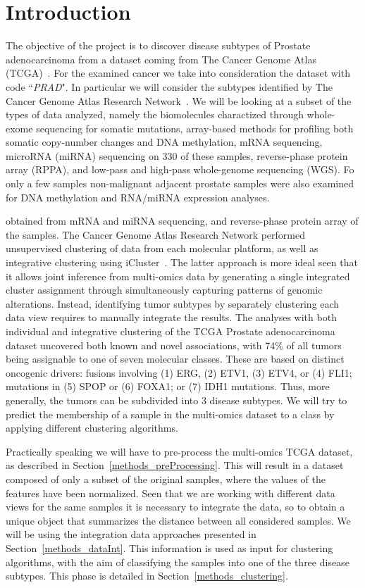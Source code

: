 \chapter{Introduction}\label{introduction}
The objective of the project is to discover disease subtypes of Prostate adenocarcinoma from a dataset coming from The Cancer Genome Atlas (TCGA)~\cite{hutter2018TCGA}. For the examined cancer we take into consideration the dataset with code ``\textit{PRAD}". In particular we will consider the subtypes identified by The Cancer Genome Atlas Research Network~\cite{abeshouse2015molecularPRAD}. We will be looking at a subset of the types of data analyzed, namely the biomolecules charactized through whole-exome sequencing for somatic mutations, array-based methods for profiling both somatic copy-number changes and DNA methylation, mRNA sequencing, microRNA (miRNA) sequencing on 330 of these samples, reverse-phase protein array (RPPA), and low-pass and high-pass whole-genome sequencing (WGS). Fo only a few samples non-malignant adjacent prostate samples were also examined for DNA methylation and RNA/miRNA expression analyses.




obtained from mRNA and miRNA sequencing, and reverse-phase protein array of the samples. The Cancer Genome Atlas Research Network performed unsupervised
clustering of data from each molecular platform, as well as integrative clustering using iCluster~\cite{shen2009integrative}. The latter approach is more ideal seen that it allows joint inference from multi-omics data by generating a single integrated cluster assignment through simultaneously capturing patterns of genomic alterations. Instead, identifying tumor subtypes by separately clustering each data view requires to manually integrate the results.
The analyses with both individual and integrative clustering of the TCGA Prostate adenocarcinoma dataset uncovered both known and novel associations, with 74\% of all tumors being assignable to one of seven molecular classes. These are based on distinct oncogenic drivers: fusions involving (1) ERG, (2) ETV1, (3) ETV4, or (4) FLI1; mutations in (5) SPOP
or (6) FOXA1; or (7) IDH1 mutations. Thus, more generally, the tumors can be subdivided into 3 disease subtypes. We will try to predict the membership of a sample in the multi-omics dataset to a class by applying different clustering algorithms.\newline

Practically speaking we will have to pre-process the multi-omics TCGA dataset, as described in Section~\ref{methods_preProcessing}. This will result in a dataset composed of only a subset of the original samples, where the values of the features have been normalized. Seen that we are working with different data views for the same samples it is necessary to integrate the data, so to obtain a unique object that summarizes the distance between all considered samples. We will be using the integration data approaches presented in Section~\ref{methods_dataInt}. This information is used as input for clustering algorithms, with the aim of classifying the samples into one of the three disease subtypes. This phase is detailed in Section~\ref{methods_clustering}.

